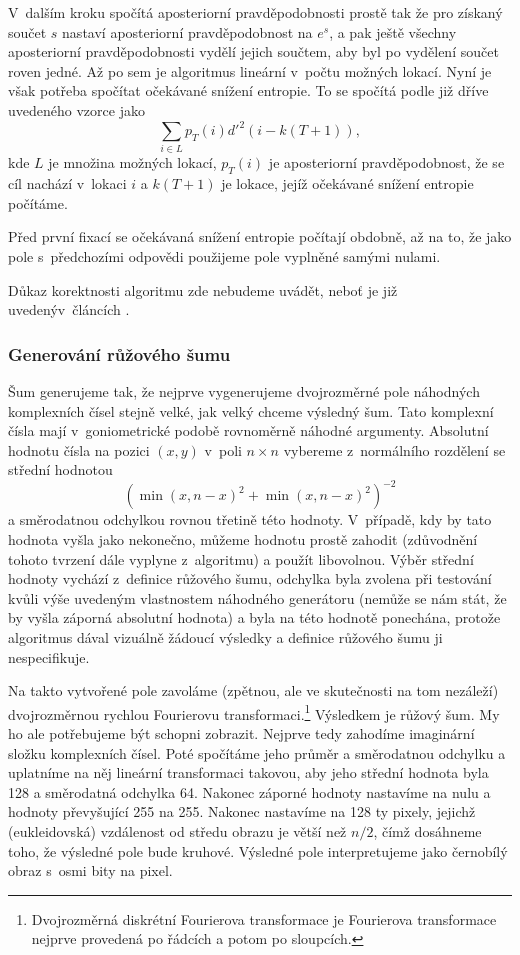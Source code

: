 V~dalším kroku spočítá aposteriorní pravděpodobnosti prostě tak že pro získaný
součet $s$ nastaví aposteriorní pravděpodobnost na $e^s$, a pak ještě všechny
aposteriorní pravděpodobnosti vydělí jejich součtem, aby byl po vydělení součet
roven jedné. Až po sem je algoritmus lineární v~počtu možných lokací. Nyní je
však potřeba spočítat očekávané snížení entropie. To se spočítá podle již dříve
uvedeného vzorce jako $$\displaystyle\sum_{i\in L} p_T(i)d'^2(i-k(T+1)),$$ kde
$L$ je množina možných lokací, $p_T(i)$ je aposteriorní pravděpodobnost, že se
cíl nachází v~lokaci $i$ a $k(T+1)$ je lokace, jejíž očekávané snížení entropie
počítáme.   

Před první fixací se očekávaná snížení entropie počítají obdobně, až na to, že
jako pole s~předchozími odpovědi použijeme pole vyplněné samými nulami.

Důkaz korektnosti algoritmu zde nebudeme uvádět, neboť je již uvedený\linebreak v~článcích \citep{Najemnik05, Najemnik08, Najemnik09}.

\subsubsection*{Generování růžového šumu}


Šum generujeme tak, že nejprve vygenerujeme dvojrozměrné pole náhodných
komplexních čísel stejně velké, jak velký chceme výsledný šum. Tato komplexní
čísla mají v~goniometrické podobě rovnoměrně náhodné argumenty. Absolutní
hodnotu čísla na pozici $(x,y)$ v~poli $n\times n$ vybereme z~normálního
rozdělení se střední hodnotou \begin{equation}\label{Pink}\left(\min\left(x,n-x\right)^2
+\min\left(x,n-x\right)^2\right)^{-2}\end{equation} a směrodatnou odchylkou rovnou třetině
této hodnoty. V~případě, kdy by tato hodnota vyšla jako nekonečno, můžeme
hodnotu prostě zahodit (zdůvodnění tohoto tvrzení dále vyplyne z~algoritmu) a
použít libovolnou. Výběr střední hodnoty vychází z~definice růžového šumu,
odchylka byla zvolena při testování kvůli výše uvedeným vlastnostem náhodného
generátoru (nemůže se nám stát, že by vyšla záporná absolutní hodnota) a byla
na této hodnotě ponechána, protože algoritmus dával vizuálně žádoucí výsledky a
definice růžového šumu ji nespecifikuje.

Na takto vytvořené pole zavoláme (zpětnou, ale ve skutečnosti na tom nezáleží)
dvojrozměrnou rychlou Fourierovu transformaci.\footnote{Dvojrozměrná diskrétní
Fourierova transformace je Fourierova transformace nejprve provedená po řádcích
a potom po sloupcích.}  Výsledkem je růžový šum. My ho ale potřebujeme být
schopni zobrazit. Nejprve tedy zahodíme imaginární složku komplexních čísel.
Poté spočítáme jeho průměr a směrodatnou odchylku a uplatníme na něj lineární
transformaci takovou, aby jeho střední hodnota byla 128 a směrodatná odchylka
64. Nakonec záporné hodnoty nastavíme na nulu a hodnoty převyšující 255 na 255.
Nakonec nastavíme na 128 ty pixely, jejichž (eukleidovská) vzdálenost od středu
obrazu je větší než $n/2$, čímž dosáhneme toho, že výsledné pole bude kruhové.
Výsledné pole interpretujeme jako černobílý obraz s~osmi bity na pixel.


